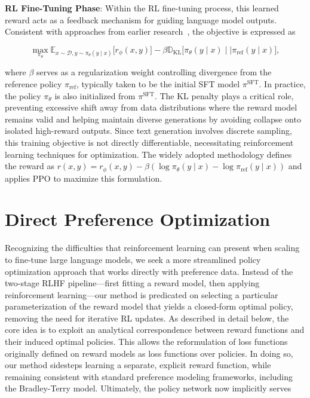 \textbf{RL Fine-Tuning Phase}: Within the RL fine-tuning process, this learned reward acts as a feedback mechanism for guiding language model outputs. Consistent with approaches from earlier research~\citep{jaques2017sequence, jaques2020human}, the objective is expressed as

\begin{equation}\label{eq:RL}
\max_{\pi_{\theta}}  \mathbb{E}_{x\sim \mathcal{D}, y\sim \pi_{\theta}(y \mid x)}\bigl[r_{\phi}(x, y)\bigr] - \beta\mathbb{D}_{\textrm{KL}}\bigl[\pi_{\theta}(y\mid x)\mid \mid \pi_\text{ref}(y\mid x)\bigr],
\end{equation}

where $\beta$ serves as a regularization weight controlling divergence from the reference policy $\pi_\text{ref}$, typically taken to be the initial SFT model $\pi^\text{SFT}$. In practice, the policy $\pi_\theta$ is also initialized from $\pi^\text{SFT}$. The KL penalty plays a critical role, preventing excessive shift away from data distributions where the reward model remains valid and helping maintain diverse generations by avoiding collapse onto isolated high-reward outputs. Since text generation involves discrete sampling, this training objective is not directly differentiable, necessitating reinforcement learning techniques for optimization. The widely adopted methodology \citep{ziegler2020finetuning, stiennon2022learning, bai2022training, ouyang2022training} defines the reward as ${r(x, y) = r_{\phi}(x, y) -\beta (\log \pi_{\theta}(y\mid x) - \log \pi_\text{ref}(y\mid x))}$ and applies PPO \cite{schulman2017proximal} to maximize this formulation.

\section{Direct Preference Optimization}\label{sec:DPO}

Recognizing the difficulties that reinforcement learning can present when scaling to fine-tune large language models, we seek a more streamlined policy optimization approach that works directly with preference data. Instead of the two-stage RLHF pipeline—first fitting a reward model, then applying reinforcement learning—our method is predicated on selecting a particular parameterization of the reward model that yields a closed-form optimal policy, removing the need for iterative RL updates. As described in detail below, the core idea is to exploit an analytical correspondence between reward functions and their induced optimal policies. This allows the reformulation of loss functions originally defined on reward models as loss functions over policies. In doing so, our method sidesteps learning a separate, explicit reward function, while remaining consistent with standard preference modeling frameworks, including the Bradley-Terry model. Ultimately, the policy network now implicitly serves


